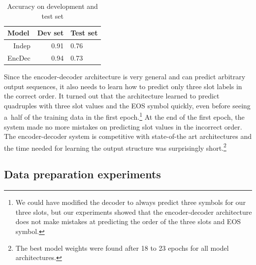 \documentclass{itatnew}
\def\OP#1{\textcolor{purple}{OP: \textit{#1}}}
\def\OP#1{\relax}  %
\begin{document}
\begin{table}
\vspace{-0.80em}
\begin{center}
\begin{tabular}{r@{\quad}rll}
\hline
\multicolumn{1}{l}{\rule{0pt}{12pt}
                   Model}&\multicolumn{1}{l}{Dev set}&\multicolumn{2}{l}{Test set}\\[2pt]
\hline\rule{0pt}{12pt}
Indep  &   0.91 & 0.76 \\
EncDec &   0.94 & 0.73 \\
\hline
\end{tabular}
\caption{Accuracy on development and test set}
\vspace{-2em}
\end{center}
\label{tab:dstc}
\end{table}

Since the encoder-decoder architecture is very general and can predict arbitrary output sequences, it also needs to learn how to predict only three slot labels in the correct order.
It turned out that the architecture learned to predict quadruples with three slot values and the EOS symbol quickly, even before seeing a~half of the training data in the first epoch.\footnote{We could have modified the decoder to always predict three symbols for our three slots, but our experiments showed that the encoder-decoder architecture does not make mistakes at predicting the order of the three slots and EOS symbol.}  
At the end of the first epoch, the system made no more mistakes on predicting slot values in the incorrect order.
The encoder-decoder system is competitive with state-of-the art architectures and the time needed for learning the output structure was surprisingly short.\footnote{The best model weights were found after 18 to 23 epochs for all model architectures.}

\subsection{Data preparation experiments}
\label{sec:split}
\end{document}
